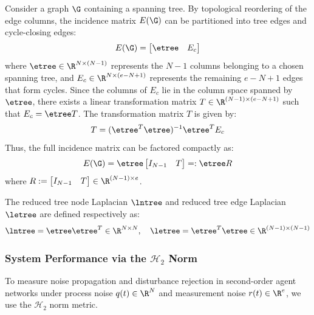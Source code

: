 \begin{definition} \label{def:spanning_tree_factorization}
\leavevmode\par\noindent
Consider a graph $\G$ containing a spanning tree. By topological reordering of the edge columns, the incidence matrix $E(\G)$ can be partitioned into tree edges and cycle-closing edges:
\begin{equation}
    E(\G) = \begin{bmatrix} \etree & E_c \end{bmatrix}
\end{equation}
where $\etree \in \R^{N \times (N-1)}$ represents the $N-1$ columns belonging to a chosen spanning tree, and $E_c \in \R^{N \times (e - N + 1)}$ represents the remaining $e - N + 1$ edges that form cycles.
Since the columns of $E_c$ lie in the column space spanned by $\etree$, there exists a linear transformation matrix $T \in \R^{(N-1) \times (e - N + 1)}$ such that $E_c = \etree T$. The transformation matrix $T$ is given by:
\begin{equation}
    T = (\etree^T \etree)^{-1} \etree^T E_c
\end{equation}
Thus, the full incidence matrix can be factored compactly as:
\begin{equation}\label{eq:incidence_factored}
    E(\G) = \etree \begin{bmatrix} I_{N-1} & T \end{bmatrix} =: \etree R
\end{equation}
where $R := \begin{bmatrix} I_{N-1} & T \end{bmatrix} \in \R^{(N-1) \times e}$.

The reduced tree node Laplacian $\lntree$ and reduced tree edge Laplacian $\letree$ are defined respectively as:
\begin{equation}
    \lntree = \etree \etree^T \in \R^{N \times N}, \quad \letree = \etree^T \etree \in \R^{(N-1) \times (N-1)}
\end{equation}
\end{definition}

\subsubsection{System Performance via the $\mathcal{H}_2$ Norm}
To measure noise propagation and disturbance rejection in second-order agent networks under process noise $q(t) \in \R^N$ and measurement noise $r(t) \in \R^e$, we use the $\mathcal{H}_2$ norm metric.

